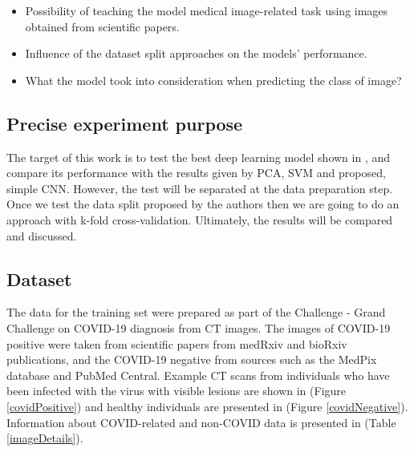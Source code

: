 \documentclass[runningheads]{llncs}
\begin{document}
\begin{itemize}
  \item Possibility of teaching the model medical image-related task using images obtained from scientific papers.
  \item Influence of the dataset split approaches on the models' performance.
  \item What the model took into consideration when predicting the class of image?
\end{itemize}

\subsection{Precise experiment purpose}

The target of this work is to test the best deep learning model shown in \cite{he2020sample}, and compare its performance with the results given by PCA, SVM and proposed, simple CNN. However, the test will be separated at the data preparation step. Once we test the data split proposed by the authors then we are going to do an approach with k-fold cross-validation. Ultimately, the results will be compared and discussed.

\subsection{Dataset}

The data for the training set were prepared as part of the Challenge - Grand Challenge on COVID-19 diagnosis from CT images. The images of COVID-19 positive were taken from scientific papers from medRxiv and bioRxiv publications, and the COVID-19 negative from sources such as the MedPix database and PubMed Central. Example CT scans from individuals who have been infected with the virus with visible lesions are shown in (Figure \ref{covidPositive}) and healthy individuals are presented in (Figure \ref{covidNegative}). Information about COVID-related and non-COVID data is presented in (Table \ref{imageDetails}).
\newline
\end{document}
